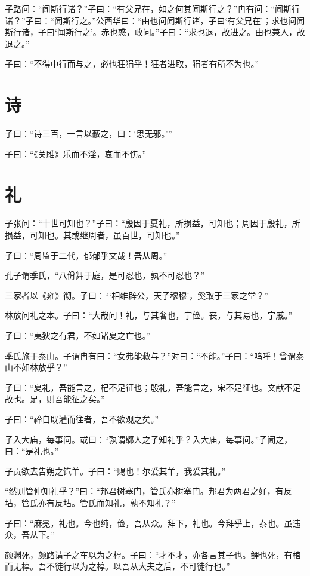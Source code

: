 \documentclass[a5paper]{ctexbook}
\begin{document}
    子路问：“闻斯行诸？”子曰：“有父兄在，如之何其闻斯行之？”冉有问：“闻斯行诸？”子曰：“闻斯行之。”公西华曰：“由也问闻斯行诸，子曰‘有父兄在’；求也问闻斯行诸，子曰‘闻斯行之’。赤也惑，敢问。”子曰：“求也退，故进之。由也兼人，故退之。”

    子曰：“不得中行而与之，必也狂狷乎！狂者进取，狷者有所不为也。”

    \chapter{诗}

    子曰：“诗三百，一言以蔽之，曰：‘思无邪。’”

    子曰：“《关雎》乐而不淫，哀而不伤。”

    \chapter{礼}

    子张问：“十世可知也？”子曰：“殷因于夏礼，所损益，可知也；周因于殷礼，所损益，可知也。其或继周者，虽百世，可知也。”

    子曰：“周监于二代，郁郁乎文哉！吾从周。”

    孔子谓季氏，“八佾舞于庭，是可忍也，孰不可忍也？”

    三家者以《雍》彻。子曰：“‘相维辟公，天子穆穆’，奚取于三家之堂？”

    林放问礼之本。子曰：“大哉问！礼，与其奢也，宁俭。丧，与其易也，宁戚。”

    子曰：“夷狄之有君，不如诸夏之亡也。”

    季氏旅于泰山。子谓冉有曰：“女弗能救与？”对曰：“不能。”子曰：“呜呼！曾谓泰山不如林放乎？”

    子曰：“夏礼，吾能言之，杞不足征也；殷礼，吾能言之，宋不足征也。文献不足故也。足，则吾能征之矣。”

    子曰：“禘自既灌而往者，吾不欲观之矣。”

    子入大庙，每事问。或曰：“孰谓鄹人之子知礼乎？入大庙，每事问。”子闻之，曰：“是礼也。”

    子贡欲去告朔之饩羊。子曰：“赐也！尔爱其羊，我爱其礼。”

    “然则管仲知礼乎？”曰：“邦君树塞门，管氏亦树塞门。邦君为两君之好，有反坫，管氏亦有反坫。管氏而知礼，孰不知礼？”

    子曰：“麻冕，礼也。今也纯，俭，吾从众。拜下，礼也。今拜乎上，泰也。虽违众，吾从下。”

    颜渊死，颜路请子之车以为之椁。子曰：“才不才，亦各言其子也。鲤也死，有棺而无椁。吾不徒行以为之椁。以吾从大夫之后，不可徒行也。”
\end{document}
